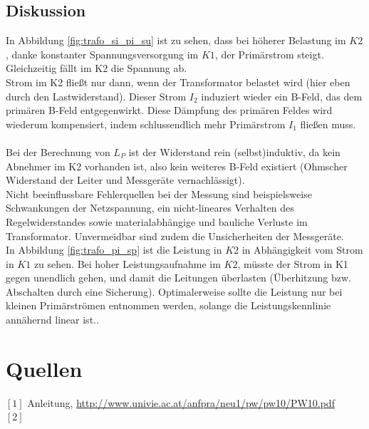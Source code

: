 \documentclass[12pt,a4paper]{article}
\begin{document}
\begin{multicols}{2}

\subsection{Diskussion}

In Abbildung \ref{fig:trafo_si_pi_su} ist zu sehen, dass bei höherer Belastung im $K2$, danke konstanter Spannungsversorgung im $K1$, der Primärstrom steigt.
Gleichzeitig fällt im K2 die Spannung ab.\\
Strom im K2 fließt nur dann, wenn der Transformator belastet wird (hier eben durch den Lastwiderstand). Dieser Strom $I_2$ induziert wieder ein B-Feld, das dem primären B-Feld entgegenwirkt. Diese Dämpfung des primären Feldes wird wiederum kompensiert, indem schlussendlich mehr Primärstrom $I_1$ fließen muss.\\
\\
Bei der Berechnung von $L_P$ ist der Widerstand rein (selbst)induktiv, da kein Abnehmer im K2 vorhanden ist, also kein weiteres B-Feld existiert (Ohmscher Widerstand der Leiter und Messgeräte vernachlässigt).\\
Nicht beeinflussbare Fehlerquellen bei der Messung sind beispielsweise Schwankungen der Netzspannung, ein nicht-lineares Verhalten des Regelwiderstandes sowie materialabhängige und bauliche Verluste im Transformator. Unvermeidbar sind zudem die Unsicherheiten der Messgeräte.\\
In Abbildung \ref{fig:trafo_pi_sp} ist die Leistung in $K2$ in Abhängigkeit vom Strom in $K1$ zu sehen. Bei hoher Leistungsaufnahme im $K2$, müsste der Strom in K1 gegen unendlich gehen, und damit die Leitungen überlasten (Überhitzung bzw. Abschalten durch eine Sicherung).
Optimalerweise sollte die Leistung nur bei kleinen Primärströmen entnommen werden, solange die Leistungskennlinie annähernd linear ist..\\





\section{Quellen}
$[1]$ Anleitung, \url{http://www.univie.ac.at/anfpra/neu1/pw/pw10/PW10.pdf}\\
$[2]$ 
\end{multicols}
\end{document}
